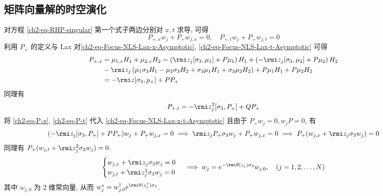 \subsection{矩阵向量解的时空演化}
对方程 \eqref{ch2-eq-RHP-singular} 第一个式子两边分别对 $ x, t $ 求导, 可得
\begin{equation}
    P_{+, x} w_{j} + P_{+} w_{j, x} = 0, \quad P_{+, t} w_{j} + P_{+} w_{j, t} = 0 \label{ch2-eq-Focus-NLS-Lax-x-t-Asymptotic}
\end{equation}
利用 $ P_{+} $ 的定义与 Lax 对\eqref{ch2-eq-Focus-NLS-Lax-x-Asymptotic}, \eqref{ch2-eq-Focus-NLS-Lax-t-Asymptotic} 可得
\begin{equation}
    \begin{aligned}
        P_{+,x} & = \mu_{1,x} H_{1} + \mu_{2,x} H_{2} = \left( \rmi z_{j} [\sigma_{3},\mu_{1}] + P\mu_{1} \right) H_{1} + \left( - \rmi z_{j} [\sigma_{3}, \mu_{2}] + P \mu_{2} \right) H_{2} \\
                & - \rmi z_{j} \left( \mu_{1} \sigma_{3} H_{1} - \mu_{2} \sigma_{3} H_{2} + \sigma_{3} \mu_{1} H_{1} + \sigma_{3} \mu_{2} H_{2} \right) + P \mu_{1} H_{1} + P \mu_{2} H_{2}   \\
                & = - \rmi z [\sigma_{3}, p_{+}] + P P_{+}
    \end{aligned} \label{ch2-eq-P-x}
\end{equation}
同理有
\begin{equation}
    P_{+,t} = - \rmi z_{j}^{2} [\sigma_{3}, P_{+}] + Q P_{+} \label{ch2-eq-P-t}
\end{equation} 将 \eqref{ch2-eq-P-x}, \eqref{ch2-eq-P-t} 代入 \eqref{ch2-eq-Focus-NLS-Lax-x-t-Asymptotic} 且由于 $ P_{+}w_{j} = 0, w_{j}P = 0 $, 有
\begin{equation}
    ( - \rmi z_{j} [\sigma_{3}, P_{+}] + P P_{+})w_{j} + P_{+}w_{j,x} = 0 \implies \rmi z_{j} P_{+} \sigma_{3} w_{j} + P_{+} w_{j,x} = 0 \implies P_{+}(w_{j,x} + \rmi z_{j} \sigma_{3}w_{j}) = 0
\end{equation}
同理有 $ P_{+}(w_{j,t} + \rmi z_{j}^{2} \sigma_{3} w_{j}) = 0 $.
\begin{equation}
    \begin{cases}
        w_{j,x} + \rmi z_{j} \sigma_{3} w_{j} = 0 \\
        w_{j,t} + \rmi z_{j}^{2} \sigma_{3} w_{j} = 0
    \end{cases} \implies w_{j} = e^{- \rmi \theta(z_{j}) \sigma_{3}} w_{j,0}, \quad (j = 1,2, \dots, N)
\end{equation}
其中 $ w_{j,0} $ 为 2 维常向量, 从而 $ w_{j}^{*} = w_{j,0}^{\dagger} e^{\rmi \theta(z_{j}^{*}) \sigma_{3}} $.

